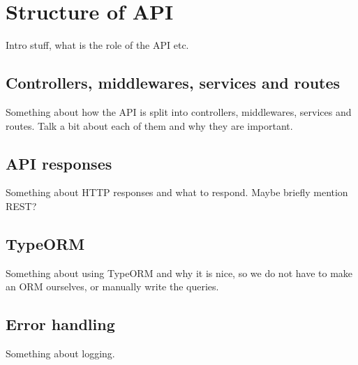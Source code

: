 \section{Structure of API}
Intro stuff, what is the role of the API etc.

\subsection{Controllers, middlewares, services and routes}
Something about how the API is split into controllers, middlewares, services and routes.
Talk a bit about each of them and why they are important.

\subsection{API responses}
Something about HTTP responses and what to respond.
Maybe briefly mention REST?

\subsection{TypeORM}
Something about using TypeORM and why it is nice, so we do not have to make an ORM ourselves, or manually write the queries.

\subsection{Error handling}
Something about logging.
